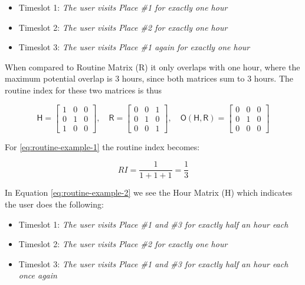 \begin{itemize}
    \item Timeslot 1: \textit{The user visits Place \#1 for exactly one hour}
    \item Timeslot 2: \textit{The user visits Place \#2 for exactly one hour}
    \item Timeslot 3: \textit{The user visits Place \#1 again for exactly one hour}
\end{itemize}

When compared to Routine Matrix (R) it only overlaps with one hour, where the maximum potential overlap is 3 hours, since both matrices sum to 3 hours. The routine index for these two matrices is thus  \label{eq:routine-index-1} 

\begin{equation}
\label{eq:routine-example-1}
    \mathsf{H} = 
    \begin{bmatrix}
    1 & 0 & 0\\
    0 & 1 & 0\\
    1 & 0 & 0
    \end{bmatrix},\quad
    \mathsf{R} = 
    \begin{bmatrix}
    0 & 0 & 1\\
    0 & 1 & 0\\
    0 & 0 & 1
    \end{bmatrix},\quad
    \mathsf{O}(\mathsf{H}, \mathsf{R}) = 
    \begin{bmatrix}
    0 & 0 & 0\\
    0 & 1 & 0\\
    0 & 0 & 0
    \end{bmatrix}
\end{equation}

For \eqref{eq:routine-example-1} the routine index becomes:

\begin{equation}
    RI = \frac{1}{1 + 1 + 1} = \frac{1}{3}
\end{equation}

In Equation \eqref{eq:routine-example-2} we see the Hour Matrix (H) which indicates the user does the following:

\begin{itemize}
    \item Timeslot 1: \textit{The user visits Place \#1 and \#3 for exactly half an hour each}
    \item Timeslot 2: \textit{The user visits Place \#2 for exactly one hour}
    \item Timeslot 3: \textit{The user visits Place \#1 and \#3 for exactly half an hour each once again}
\end{itemize}

